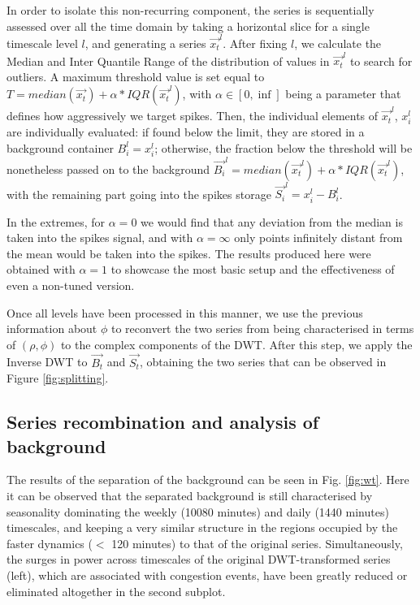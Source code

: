 \documentclass[a4paper, 10pt, conference]{ieeeconf}      %
\begin{document}
In order to isolate this non-recurring component, the series is sequentially assessed over all the time domain by taking a horizontal slice for a single timescale level $l$, and generating a series $\vec{x_{t}}^l$.
After fixing $l$, we calculate the Median and Inter Quantile Range of the distribution of values in $\vec{x_{t}}^l$ to search for outliers.
A maximum threshold value is set equal to $T = median(\vec{x_t}) + \alpha * IQR(\vec{x_{t}}^l)$, with $\alpha \in [0,\inf]$ being a parameter that defines how aggressively we target spikes. 
Then, the individual elements of $\vec{x_{t}}^l$, $x_{i}^l$ are individually evaluated: if found below the limit, they are stored in a background container $B_i^l = x_{i}^l$; otherwise, the fraction below the threshold will be nonetheless passed on to the background $\vec{B_i}^l = median(\vec{x_{t}}^l) + \alpha * IQR(\vec{x_{t}}^l)$, with the remaining part going into the spikes storage $\vec{S_i}^l = x_{i}^l - B_{i}^l$.

In the extremes, for $\alpha = 0$ we would find that any deviation from the median is taken into the spikes signal, and with $\alpha = \infty$ only points infinitely distant from the mean would be taken into the spikes.
The results produced here were obtained with $\alpha=1$ to showcase the most basic setup and the effectiveness of even a non-tuned version.

Once all levels have been processed in this manner, we use the previous information about $\phi$ to reconvert the two series from being characterised in terms of $(\rho, \phi)$ to the complex components of the DWT.
After this step, we apply the Inverse DWT to $\vec{B_t}$ and $\vec{S_t}$, obtaining the two series that can be observed in Figure \ref{fig:splitting}.

\subsection{Series recombination  and analysis of background}
The results of the separation of the background can be seen in Fig. \ref{fig:wt}. Here it can be observed that the separated background is still characterised by seasonality dominating the weekly (10080 minutes) and daily (1440 minutes) timescales, and keeping a very similar structure in the regions occupied by the faster dynamics ($<$ 120 minutes) to that of the original series.
Simultaneously, the surges in power across timescales of the original DWT-transformed series (left), which are associated with congestion events, have been greatly reduced or eliminated altogether in the second subplot.
\end{document}
